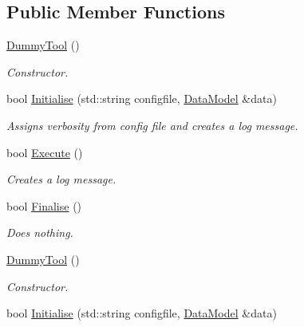 \subsection*{Public Member Functions}
\begin{DoxyCompactItemize}
\item 
\hypertarget{classDummyTool_a33914471b4de346168aa92b5febb6f9c}{\hyperlink{classDummyTool_a33914471b4de346168aa92b5febb6f9c}{Dummy\-Tool} ()}\label{classDummyTool_a33914471b4de346168aa92b5febb6f9c}

\begin{DoxyCompactList}\small\item\em Constructor. \end{DoxyCompactList}\item 
\hypertarget{classDummyTool_a0d9cd781681a06ee3cf0cd1e7bb770a8}{bool \hyperlink{classDummyTool_a0d9cd781681a06ee3cf0cd1e7bb770a8}{Initialise} (std\-::string configfile, \hyperlink{classDataModel}{Data\-Model} \&data)}\label{classDummyTool_a0d9cd781681a06ee3cf0cd1e7bb770a8}

\begin{DoxyCompactList}\small\item\em Assigns verbosity from config file and creates a log message. \end{DoxyCompactList}\item 
\hypertarget{classDummyTool_ac107b31f1785c1cc803e0e65be548047}{bool \hyperlink{classDummyTool_ac107b31f1785c1cc803e0e65be548047}{Execute} ()}\label{classDummyTool_ac107b31f1785c1cc803e0e65be548047}

\begin{DoxyCompactList}\small\item\em Creates a log message. \end{DoxyCompactList}\item 
\hypertarget{classDummyTool_aacb5d0b9906a27c2b4bba4aae9bc093a}{bool \hyperlink{classDummyTool_aacb5d0b9906a27c2b4bba4aae9bc093a}{Finalise} ()}\label{classDummyTool_aacb5d0b9906a27c2b4bba4aae9bc093a}

\begin{DoxyCompactList}\small\item\em Does nothing. \end{DoxyCompactList}\item 
\hypertarget{classDummyTool_a33914471b4de346168aa92b5febb6f9c}{\hyperlink{classDummyTool_a33914471b4de346168aa92b5febb6f9c}{Dummy\-Tool} ()}\label{classDummyTool_a33914471b4de346168aa92b5febb6f9c}

\begin{DoxyCompactList}\small\item\em Constructor. \end{DoxyCompactList}\item 
\hypertarget{classDummyTool_a0d9cd781681a06ee3cf0cd1e7bb770a8}{bool \hyperlink{classDummyTool_a0d9cd781681a06ee3cf0cd1e7bb770a8}{Initialise} (std\-::string configfile, \hyperlink{classDataModel}{Data\-Model} \&data)}\label{classDummyTool_a0d9cd781681a06ee3cf0cd1e7bb770a8}


\end{DoxyCompactItemize}
